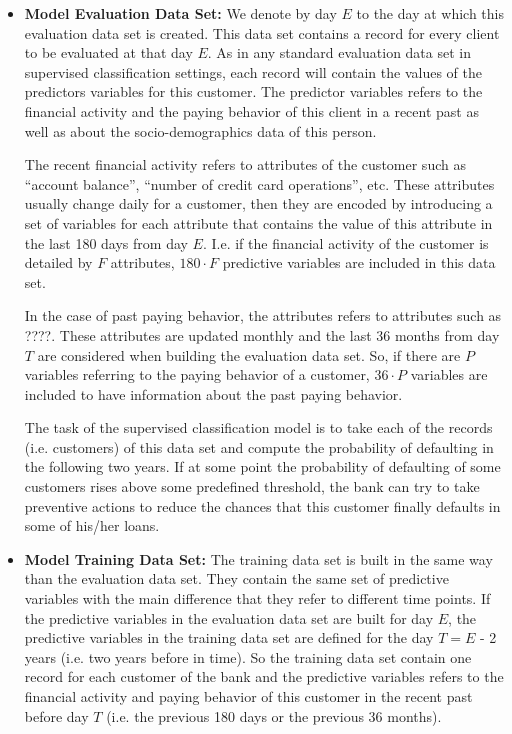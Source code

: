 \begin{itemize}
\item \textbf{Model Evaluation Data Set:} We denote by day $E$ to the day at which this evaluation data set is created. This data set contains a record for every client to be evaluated at that day $E$. As in any standard evaluation data set in supervised classification settings, each record will contain the values of the predictors variables for this customer. The predictor variables refers to the financial activity and the paying behavior of this client in a recent past as well as about the socio-demographics data of this person. 

The recent financial activity refers to attributes of the customer such as ``account balance'', ``number of credit card operations'', etc. These attributes usually change daily for a customer, then they are encoded by introducing a set of variables for each attribute that contains the value of this attribute in the last 180 days from day $E$. I.e. if the financial activity of the customer is detailed by $F$ attributes,   $180\cdot F$ predictive variables are included in this data set.

In the case of past paying behavior, the attributes refers to attributes such as ????. These attributes are updated monthly and the last 36 months from day $T$ are considered when building the evaluation data set. So, if there are $P$ variables referring to the paying behavior of a customer, $36\cdot P$ variables are included to have information  about the past paying behavior.  

The task of the supervised classification model is to take each of the records (i.e. customers) of this data set and compute the probability of defaulting in the following two years. If at some point the probability of defaulting of some customers rises above some predefined threshold, the bank can try to take preventive actions to reduce the chances that this customer finally defaults in some of his/her loans.

\item \textbf{Model Training Data Set:}  The training data set is built in the same way than the evaluation data set. They contain the same set of predictive variables with the main difference that they refer to different time points. If the predictive variables in the evaluation data set are built for day $E$, the predictive variables in the training data set are defined for the day $T = E$ - 2 years (i.e. two years before in time). So the training data set contain one record for each customer of the bank and the predictive variables refers to the financial activity and paying behavior of this customer in the recent past before day $T$ (i.e. the previous 180 days or the previous 36 months). 


\end{itemize}
